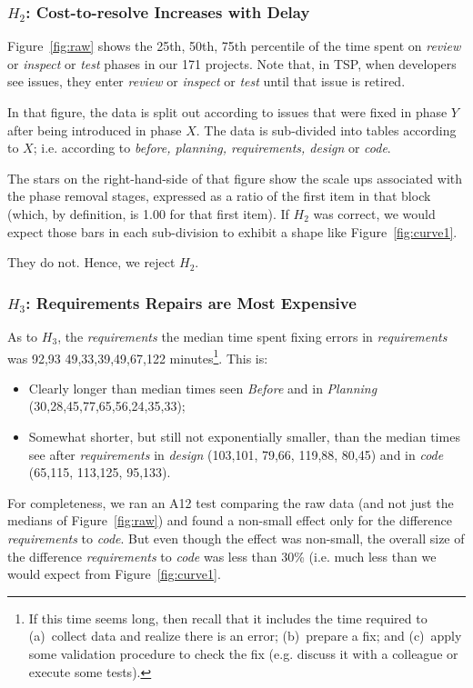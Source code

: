 \documentclass{sig-alternate}
\newcommand{\bi}{\begin{itemize}}%
\newcommand{\ei}{\end{itemize}}
\newcommand{\fig}[1]{Figure~\ref{fig:#1}}
\begin{document}
 \subsubsection{$H_2$: Cost-to-resolve Increases with Delay}

%
\fig{raw} shows the 25th, 50th, 75th percentile
of the time spent on {\em review} or {\em inspect} or {\em test} phases
in our 171 projects.
Note that, in TSP, when developers see issues, they enter {\em review} or 
{\em inspect} or {\em test}
until that issue is retired.

In that figure, the data is split out according to issues that were fixed in phase $Y$ after
being introduced in phase $X$. The data is sub-divided into tables according to $X$;
i.e. according to {\em before, planning, requirements, design} or {\em  code}. 

The stars on the right-hand-side of that figure show the scale ups associated with the phase removal stages,
expressed as a ratio of the first item in that block (which, by definition, is 1.00 for
that first item).
If $H_2$ was correct, we would expect those bars in each sub-division to exhibit a  shape
like \fig{curve1}. 

They do not. Hence, we reject $H_2$.


 \subsubsection{$H_3$: Requirements Repairs are Most Expensive}
 
As to $H_3$, the {\em requirements} the  median time spent fixing errors in {\em requirements} was 92,93  49,33,39,49,67,122 minutes\footnote{If this time seems long, then recall
that it includes the time required  to (a)~collect data and realize there is an error;
(b)~prepare a fix;  and (c)~apply some validation
procedure to check the fix (e.g. discuss it with a colleague or execute some tests).}.
This is:
\bi
\item
Clearly longer than median times seen {\em Before } and in {\em Planning}
(30,28,45,77,65,56,24,35,33);
\item
Somewhat shorter, but still not exponentially smaller,  than the median times see after {\em requirements} in {\em design}
(103,101, 79,66, 119,88, 80,45) and in {\em code} (65,115, 113,125, 95,133). 
\ei
For completeness, we ran an  
A12 test comparing the raw data (and not just the medians of \fig{raw}) and found
 a non-small effect only for the difference {\em requirements}
to {\em code}. But even though the effect was non-small, 
 the overall size of the difference
{\em requirements} to {\em code} was less than 30\% (i.e. much less than we would
expect from \fig{curve1}. 
\end{document}
